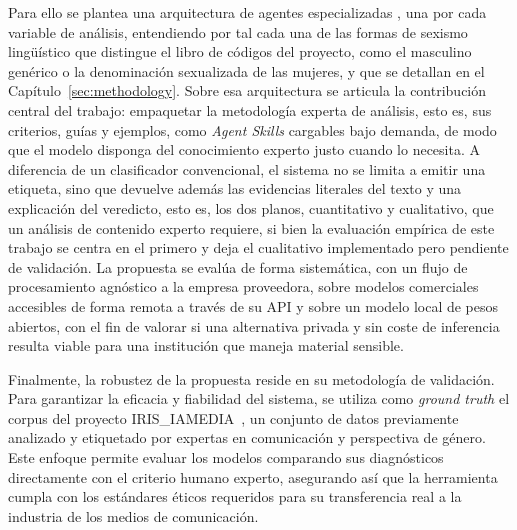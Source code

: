 Para ello se plantea una arquitectura de agentes especializadas \cite{li2023}, una por cada variable de análisis, entendiendo por tal cada una de las formas de sexismo lingüístico que distingue el libro de códigos del proyecto, como el masculino genérico o la denominación sexualizada de las mujeres, y que se detallan en el Capítulo~\ref{sec:methodology}. Sobre esa arquitectura se articula la contribución central del trabajo: empaquetar la metodología experta de análisis, esto es, sus criterios, guías y ejemplos, como \textit{Agent Skills} \cite{anthropic2025skills} cargables bajo demanda, de modo que el modelo disponga del conocimiento experto justo cuando lo necesita. A diferencia de un clasificador convencional, el sistema no se limita a emitir una etiqueta, sino que devuelve además las evidencias literales del texto y una explicación del veredicto, esto es, los dos planos, cuantitativo y cualitativo, que un análisis de contenido experto requiere, si bien la evaluación empírica de este trabajo se centra en el primero y deja el cualitativo implementado pero pendiente de validación. La propuesta se evalúa de forma sistemática, con un flujo de procesamiento agnóstico a la empresa proveedora, sobre modelos comerciales accesibles de forma remota a través de su API y sobre un modelo local de pesos abiertos, con el fin de valorar si una alternativa privada y sin coste de inferencia resulta viable para una institución que maneja material sensible.

Finalmente, la robustez de la propuesta reside en su metodología de validación. Para garantizar la eficacia y fiabilidad del sistema, se utiliza como \textit{ground truth} el corpus del proyecto IRIS\_IAMEDIA~\cite{irisiamedia}, un conjunto de datos previamente analizado y etiquetado por expertas en comunicación y perspectiva de género. Este enfoque permite evaluar los modelos comparando sus diagnósticos directamente con el criterio humano experto, asegurando así que la herramienta cumpla con los estándares éticos requeridos para su transferencia real a la industria de los medios de comunicación.